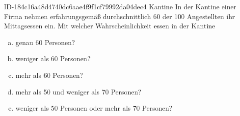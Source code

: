 \begin{exercise}
      {ID-184c16a48d4740dc6aae4f9f1cf79992da04dec4}
      {Kantine}
  \ifproblem\problem
    In der Kantine einer Firma nehmen erfahrungsgemäß durchschnittlich 60
    der 100 Angestellten ihr Mittagsessen ein. Mit welcher Wahrscheinlichkeit
    essen in der Kantine
    \begin{enumerate}[a)]
      \item genau 60 Personen?
      \item weniger als 60 Personen?
      \item mehr als 60 Personen?
      \item mehr als 50 und weniger als 70 Personen?
      \item weniger als 50 Personen oder mehr als 70 Personen?
    \end{enumerate}
  \fi
\end{exercise}
